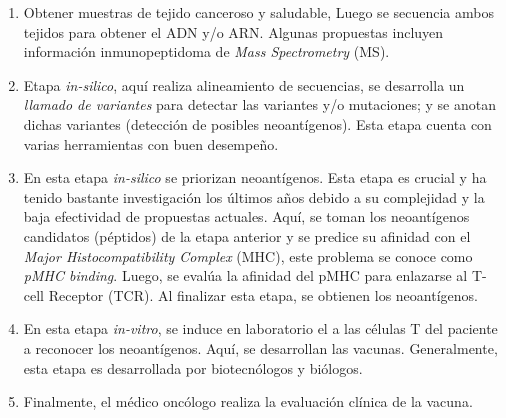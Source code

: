 \documentclass[a4paper]{article}
\begin{document}
	
	\begin{enumerate}
		\item Obtener muestras de tejido canceroso y saludable, Luego se secuencia ambos tejidos para obtener el ADN y/o ARN. Algunas propuestas incluyen información inmunopeptidoma de \textit{Mass Spectrometry} (MS).
		\item Etapa \textit{in-silico}, aquí realiza alineamiento de secuencias, se desarrolla un \textit{llamado de variantes} para detectar las variantes y/o mutaciones; y se anotan dichas variantes (detección de posibles neoantígenos). Esta etapa cuenta con varias herramientas con buen desempeño.
		\item En esta etapa \textit{in-silico} se priorizan neoantígenos. Esta etapa es crucial y ha tenido bastante investigación los últimos años debido a su complejidad y la baja efectividad de propuestas actuales. Aquí, se toman los neoantígenos candidatos (péptidos) de la etapa anterior y se predice su afinidad con el \textit{Major Histocompatibility Complex} (MHC), este problema se conoce como \textit{pMHC binding}. Luego, se  evalúa la afinidad del pMHC para enlazarse al T-cell Receptor (TCR). Al finalizar esta etapa, se obtienen los neoantígenos.
		\item En esta etapa \textit{in-vitro}, se induce en laboratorio el a las células T del paciente a reconocer los neoantígenos. Aquí, se desarrollan las vacunas. Generalmente, esta etapa es desarrollada por biotecnólogos y biólogos.
		\item Finalmente, el médico oncólogo realiza la evaluación clínica de la vacuna.
	\end{enumerate}
	
	
	
	
	
	
	
\end{document}
